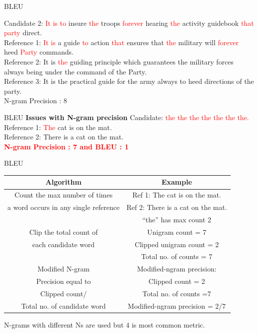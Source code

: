 ﻿\documentclass[table,aspectratio=43,mathserif,xcolor={usenames,dvipsnames,svgnames,table},10pt]{beamer}
\begin{document}
\begin{frame}{BLEU}

Candidate 2: \textcolor{red} {It is to} insure \textcolor{red} {the} troops \textcolor{red} {forever} hearing \textcolor{red} {the} activity guidebook \textcolor{red} {that party} direct. 
\\
Reference 1: \textcolor{red} {It is} a guide \textcolor{red} {to} action \textcolor{red} {that} ensures that \textcolor{red} {the} military will \textcolor{red} {forever} heed \textcolor{red} {Party} commands. 
\\
Reference 2: It is \textcolor{red} {the} guiding principle which guarantees the military forces always being under the command of the Party.
\\
Reference 3: It is the practical guide for the army always to heed directions of the party.
\\
N-gram Precision : 8
\end{frame}

\begin{frame}{BLEU}
\textbf{Issues with N-gram precision}
Candidate: \textcolor{red} {the the the the the the the.} \\
Reference 1: \textcolor{red} {The} cat is on the mat. \\
Reference 2: There is a cat on the mat.\\

\textbf{ \textcolor{red}{N-gram Precision : 7 and BLEU : 1}}
\end{frame}


\begin{frame}{BLEU}
 \begin{table}
    \centering
    \begin{tabular}{|c|c|}
        \hline
        \textbf{Algorithm}  & \textbf{Example}  \\ \hline
        Count the max number of times       &       Ref 1: The cat is on the mat.  \\
        a word occurs in any single reference &   Ref 2: There is a cat on the mat. \\
        &“the” has max count 2         \\ %
 \hline
	Clip the total count of & Unigram count = 7 \\
	each candidate word & Clipped unigram count = 2 \\
	&Total no. of counts = 7 \\
\hline
	Modified N-gram & Modified-ngram precision: \\
	Precision equal to & Clipped count = 2 \\
	Clipped count/ & Total no. of counts =7\\
	Total no. of candidate word & Modified-ngram precision = 2/7\\
\hline	
    \end{tabular}
N-grams with different Ns are used but 4 is most common metric.
\end{table}
\end{frame}
\end{document}
